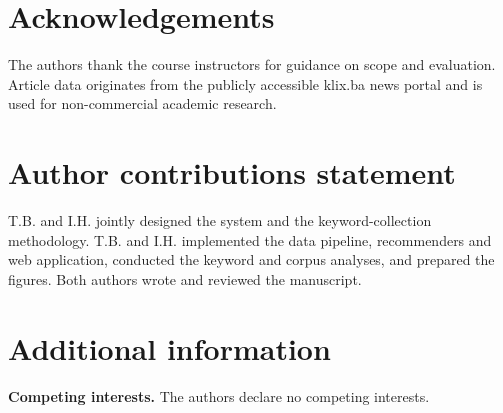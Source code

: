 \documentclass[fleqn,10pt]{wlscirep}
\begin{document}
\section*{Acknowledgements}

The authors thank the course instructors for guidance on scope and evaluation. Article data originates from the publicly accessible klix.ba news portal and is used for non-commercial academic research.

\section*{Author contributions statement}

T.B. and I.H. jointly designed the system and the keyword-collection methodology. T.B. and I.H. implemented the data pipeline, recommenders and web application, conducted the keyword and corpus analyses, and prepared the figures. Both authors wrote and reviewed the manuscript.

\section*{Additional information}

\textbf{Competing interests.} The authors declare no competing interests.
\end{document}
